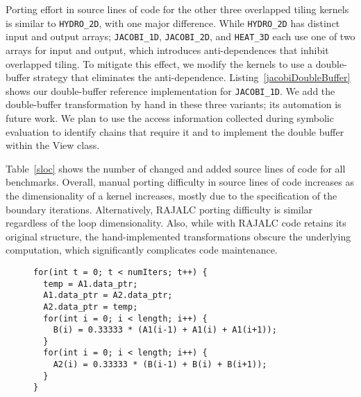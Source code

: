 Porting effort in source lines of code
for the other three overlapped tiling kernels is similar to 
\verb.HYDRO_2D., with one major difference.  
While \verb.HYDRO_2D. has distinct input and output arrays; \verb.JACOBI_1D., 
\verb.JACOBI_2D., and \verb.HEAT_3D. each use one of two arrays for
input and output, which introduces anti-dependences that inhibit 
overlapped tiling. 
To mitigate this effect, we modify the kernels to use
a double-buffer strategy that eliminates the anti-dependence. 
Listing~\ref{jacobiDoubleBuffer} shows our double-buffer reference
implementation for \verb.JACOBI_1D..
We add the double-buffer transformation by hand in these three variants;
its automation is future work.
We plan to use the access information collected during symbolic evaluation
to identify chains that require it and to implement the double buffer within
the View class.

Table~\ref{sloc} shows the number of changed and added source lines of code
for all benchmarks.
Overall, manual porting difficulty in source lines of code 
increases as the dimensionality of a 
kernel increases, mostly due to the specification of the boundary iterations. 
Alternatively, RAJALC porting difficulty is similar regardless of the loop
dimensionality.
Also, while with RAJALC code retains its original structure, the 
hand-implemented transformations obscure the underlying computation,
which significantly complicates code maintenance.

\begin{figure}[t]
\begin{lstlisting}[label={jacobiDoubleBuffer},caption={Double-Buffer Implementation for JACOBI\_1D}]
for(int t = 0; t < numIters; t++) {
  temp = A1.data_ptr;
  A1.data_ptr = A2.data_ptr;
  A2.data_ptr = temp;
  for(int i = 0; i < length; i++) {
    B(i) = 0.33333 * (A1(i-1) + A1(i) + A1(i+1));
  }
  for(int i = 0; i < length; i++) {
    A2(i) = 0.33333 * (B(i-1) + B(i) + B(i+1));
  }
}
\end{lstlisting}
\end{figure}

